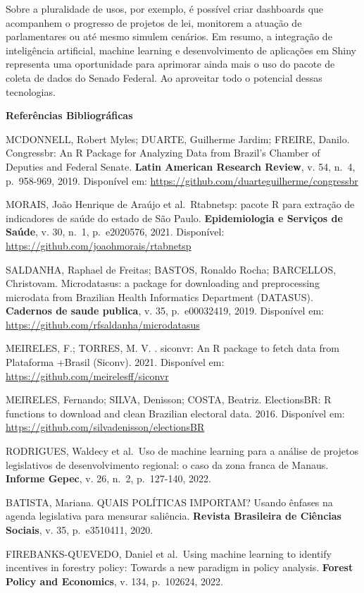 \documentclass{article}
\begin{document}
Sobre a pluralidade de usos, por exemplo, é possível criar dashboards
que acompanhem o progresso de projetos de lei, monitorem a atuação de
parlamentares ou até mesmo simulem cenários. Em resumo, a integração de
inteligência artificial, machine learning e desenvolvimento de
aplicações em Shiny representa uma oportunidade para aprimorar ainda
mais o uso do pacote de coleta de dados do Senado Federal. Ao aproveitar
todo o potencial dessas tecnologias.

\textbf{Referências Bibliográficas}

MCDONNELL, Robert Myles; DUARTE, Guilherme Jardim; FREIRE, Danilo.
Congressbr: An R Package for Analyzing Data from Brazil's Chamber of
Deputies and Federal Senate. \textbf{Latin American Research Review}, v.
54, n.~4, p.~958-969, 2019. Disponível em:
\url{https://github.com/duarteguilherme/congressbr}

MORAIS, João Henrique de Araújo et al.~Rtabnetsp: pacote R para extração
de indicadores de saúde do estado de São Paulo. \textbf{Epidemiologia e
Serviços de Saúde}, v. 30, n.~1, p.~e2020576, 2021. Disponível:
\url{https://github.com/joaohmorais/rtabnetsp}

SALDANHA, Raphael de Freitas; BASTOS, Ronaldo Rocha; BARCELLOS,
Christovam. Microdatasus: a package for downloading and preprocessing
microdata from Brazilian Health Informatics Department (DATASUS).
\textbf{Cadernos de saude publica}, v. 35, p.~e00032419, 2019.
Disponível em: \url{https://github.com/rfsaldanha/microdatasus}

MEIRELES, F.; TORRES, M. V. . siconvr: An R package to fetch data from
Plataforma +Brasil (Siconv). 2021. Disponível em:
\url{https://github.com/meirelesff/siconvr}

MEIRELES, Fernando; SILVA, Denisson; COSTA, Beatriz. ElectionsBR: R
functions to download and clean Brazilian electoral data. 2016.
Disponível em: \url{https://github.com/silvadenisson/electionsBR}

RODRIGUES, Waldecy et al.~Uso de machine learning para a análise de
projetos legislativos de desenvolvimento regional: o caso da zona franca
de Manaus. \textbf{Informe Gepec}, v. 26, n.~2, p.~127-140, 2022.

BATISTA, Mariana. QUAIS POLÍTICAS IMPORTAM? Usando ênfases na agenda
legislativa para mensurar saliência. \textbf{Revista Brasileira de
Ciências Sociais}, v. 35, p.~e3510411, 2020.

FIREBANKS-QUEVEDO, Daniel et al.~Using machine learning to identify
incentives in forestry policy: Towards a new paradigm in policy
analysis. \textbf{Forest Policy and Economics}, v. 134, p.~102624, 2022.
\end{document}
